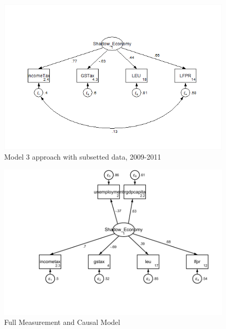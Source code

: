 \documentclass[12pt]{report}
\begin{document}
\begin{figure}[htbp]
	\centering
	\includegraphics[width=0.7\linewidth]{"SEM_5"}
	\caption{Model 3 approach with subsetted data, 2009-2011}
	\label{fig:model-5}
\end{figure}

\begin{figure}[htbp]
	\centering
	\includegraphics[width=0.7\linewidth]{"SEM_6"}
	\caption{Full Measurement and Causal Model}
	\label{fig:model-6}
\end{figure}
 
\end{document}
